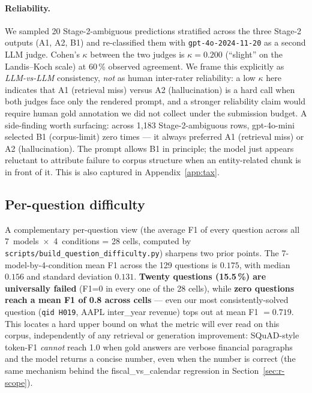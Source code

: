 \documentclass[11pt]{article}
\begin{document}
\paragraph{Reliability.}
We sampled 20 Stage-2-ambiguous predictions stratified across the
three Stage-2 outputs (A1, A2, B1) and re-classified them with
\texttt{gpt-4o-2024-11-20} as a second LLM judge. Cohen's $\kappa$
between the two judges is $\kappa = 0.200$ (``slight'' on the
Landis--Koch scale) at 60\,\% observed agreement. We frame this
explicitly as \emph{LLM-vs-LLM} consistency, \emph{not} as
human inter-rater reliability: a low $\kappa$ here indicates that
A1 (retrieval miss) versus A2 (hallucination) is a hard call when
both judges face only the rendered prompt, and a stronger reliability
claim would require human gold annotation we did not collect under
the submission budget.
A side-finding worth surfacing: across 1{,}183 Stage-2-ambiguous
rows, gpt-4o-mini selected B1 (corpus-limit) zero times --- it
always preferred A1 (retrieval miss) or A2 (hallucination). The
prompt allows B1 in principle; the model just appears reluctant to
attribute failure to corpus structure when an entity-related chunk
is in front of it. This is also captured in
Appendix~\ref{app:tax}.

\subsection{Per-question difficulty}
\label{sec:per-q}

A complementary per-question view (the average F1 of every question
across all 7~models~$\times$~4~conditions = 28 cells, computed by
\texttt{scripts/build\_question\_difficulty.py}) sharpens two prior
points. The 7-model-by-4-condition mean F1 across the 129 questions
is $0.175$, with median $0.156$ and standard deviation $0.131$.
\textbf{Twenty questions (15.5\,\%) are universally failed} (F1=0 in
every one of the 28 cells), while \textbf{zero questions reach a mean
F1 of 0.8 across cells} --- even our most consistently-solved
question (\texttt{qid H019}, AAPL inter\_year revenue) tops out at
mean F1 $= 0.719$. This locates a hard upper bound on what the
metric will ever read on this corpus, independently of any retrieval
or generation improvement: SQuAD-style token-F1 \emph{cannot} reach
1.0 when gold answers are verbose financial paragraphs and the model
returns a concise number, even when the number is correct (the same
mechanism behind the fiscal\_vs\_calendar regression in
Section~\ref{sec:r-scope}).
\end{document}
